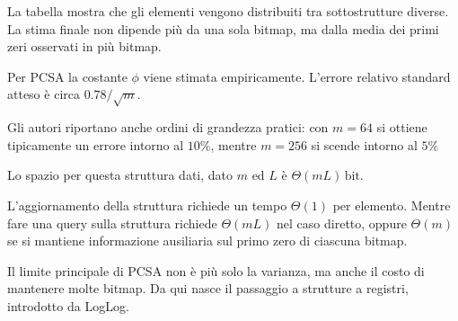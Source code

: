 \begin{table}[htbp]
    \centering
    \small
    \setlength{\tabcolsep}{4pt}
    \renewcommand{\arraystretch}{1.1}
    \caption{Esempio operativo di PCSA}
    \label{tab:pcsa-esempio}
\end{table}

La tabella mostra che gli elementi vengono distribuiti tra sottostrutture
diverse. La stima finale non dipende più da una sola bitmap, ma dalla media dei
primi zeri osservati in più bitmap.

Per PCSA la costante $\phi$ viene stimata empiricamente. L'errore relativo
standard atteso è circa $0.78/\sqrt{m}$.

Gli autori riportano anche ordini di grandezza pratici: con
$m=64$ si ottiene tipicamente un errore intorno al $10\%$, mentre
$m=256$ si scende intorno al $5\%$

Lo spazio per questa struttura dati, dato $m$ ed $L$ \`e $\Theta(mL)\,\text{bit}$.

L'aggiornamento della struttura richiede un tempo $\Theta(1)$ per elemento. Mentre 
fare una query sulla struttura richiede $\Theta(mL)$ nel caso diretto, oppure $\Theta(m)$
se si mantiene informazione ausiliaria sul primo zero di ciascuna bitmap.

Il limite principale di PCSA non è più solo la varianza, ma anche il costo di
mantenere molte bitmap. Da qui nasce il passaggio a strutture a registri,
introdotto da LogLog.


